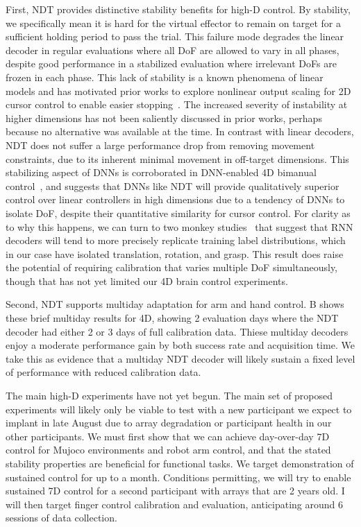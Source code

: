 \documentclass[12pt,oneside]{report}
\begin{document}
First, NDT provides distinctive stability benefits for high-D control. By stability, we specifically mean it is hard for the virtual effector to remain on target for a sufficient holding period to pass the trial. This failure mode degrades the linear decoder in regular evaluations where all DoF are allowed to vary in all phases, despite good performance in a stabilized evaluation where irrelevant DoFs are frozen in each phase. This lack of stability is a known phenomena of linear models and has motivated prior works to explore nonlinear output scaling for 2D cursor control to enable easier stopping~\citep{sachs2015brain,card2025long}.
The increased severity of instability at higher dimensions has not been saliently discussed in prior works, perhaps because no alternative was available at the time. In contrast with linear decoders, NDT does not suffer a large performance drop from removing movement constraints, due to its inherent minimal movement in off-target dimensions. This stabilizing aspect of DNNs is corroborated in DNN-enabled 4D bimanual control~\citep{deo_23_impulse}, and suggests that DNNs like NDT will provide qualitatively superior control over linear controllers in high dimensions due to a tendency of DNNs to isolate DoF, despite their quantitative similarity for cursor control. For clarity as to why this happens, we can turn to two monkey studies~\citep{temmar2024artificial,costello2023balancing} that suggest that RNN decoders will tend to more precisely replicate training label distributions, which in our case have isolated translation, rotation, and grasp. This result does raise the potential of requiring calibration that varies multiple DoF simultaneously, though that has not yet limited our 4D brain control experiments.

Second, NDT supports multiday adaptation for arm and hand control. B shows these brief multiday results for 4D, showing 2 evaluation days where the NDT decoder had either 2 or 3 days of full calibration data. Thiese multiday decoders enjoy a moderate performance gain by both success rate and acquisition time. We take this as evidence that a multiday NDT decoder will likely sustain a fixed level of performance with reduced calibration data.

The main high-D experiments have not yet begun. The main set of proposed experiments will likely only be viable to test with a new participant we expect to implant in late August due to array degradation or participant health in our other participants. We must first show that we can achieve day-over-day 7D control for Mujoco environments and robot arm control, and that the stated stability properties are beneficial for functional tasks. We target demonstration of sustained control for up to a month. Conditions permitting, we will try to enable sustained 7D control for a second participant with arrays that are 2 years old. I will then target finger control calibration and evaluation, anticipating around 6 sessions of data collection.
\end{document}
